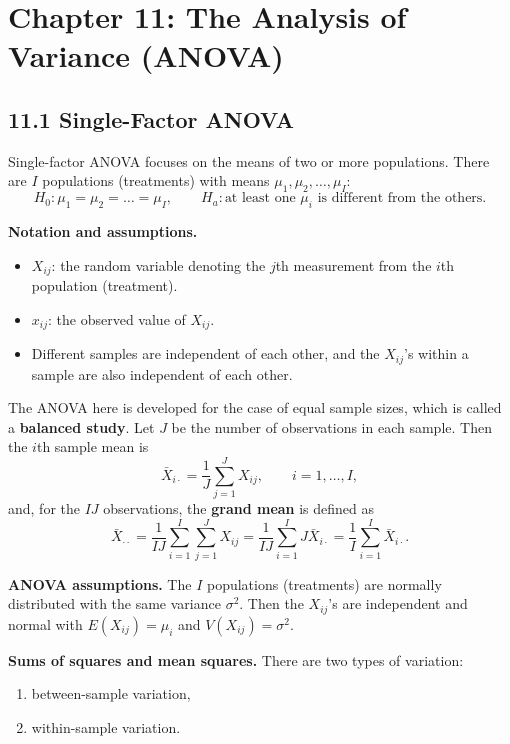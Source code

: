 \section*{Chapter 11: The Analysis of Variance (ANOVA)}

\subsection*{11.1 Single-Factor ANOVA}

Single-factor ANOVA focuses on the means of two or more populations. There are $I$ populations (treatments) with means $\mu_1,\mu_2,\dots,\mu_I$:
\[
H_0:\mu_1=\mu_2=\dots=\mu_I,\qquad H_a: \text{at least one } \mu_i \text{ is different from the others}.
\]

\textbf{Notation and assumptions.}
\begin{itemize}
  \item $X_{ij}$: the random variable denoting the $j$th measurement from the $i$th population (treatment).
  \item $x_{ij}$: the observed value of $X_{ij}$.
  \item Different samples are independent of each other, and the $X_{ij}$'s within a sample are also independent of each other.
\end{itemize}
The ANOVA here is developed for the case of equal sample sizes, which is called a \textbf{balanced study}.
Let $J$ be the number of observations in each sample. Then the $i$th sample mean is
\[
\bar{X}_{i\cdot} = \frac{1}{J}\sum_{j=1}^J X_{ij},\qquad i=1,\dots,I,
\]
and, for the $IJ$ observations, the \textbf{grand mean} is defined as
\[
\bar{X}_{\cdot\cdot} = \frac{1}{IJ}\sum_{i=1}^I\sum_{j=1}^J X_{ij} = \frac{1}{IJ}\sum_{i=1}^I J\bar{X}_{i\cdot} = \frac{1}{I}\sum_{i=1}^I\bar{X}_{i\cdot}.
\]

\textbf{ANOVA assumptions.} The $I$ populations (treatments) are normally distributed with the same variance $\sigma^2$.
Then the $X_{ij}$'s are independent and normal with $E(X_{ij})=\mu_i$ and $V(X_{ij})=\sigma^2$.

\textbf{Sums of squares and mean squares.} There are two types of variation:
\begin{enumerate}
  \item between-sample variation,
  \item within-sample variation.
\end{enumerate}

